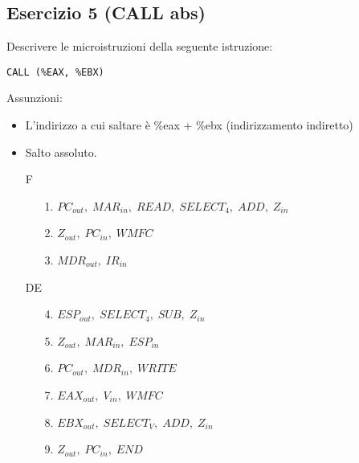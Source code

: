 \documentclass[a4paper]{article}
\theoremstyle{break}
\theoremstyle{break}
\theoremstyle{break}
\theoremstyle{break}
\begin{document}
\subsection{Esercizio 5 (CALL abs)}
\begin{exercise}
  Descrivere le microistruzioni della seguente istruzione:
  \begin{center}
    \texttt{CALL (\%EAX, \%EBX)}
  \end{center}

  Assunzioni:
  \begin{itemize}
    \item 
      L'indirizzo a cui saltare è \%eax + \%ebx (indirizzamento indiretto) 
    \item 
      Salto assoluto.
  \end{itemize}

  \begin{enumerate}
    \item [F]
      \begin{enumerate}
        \item [1.] \( PC_{out},\; MAR_{in},\; READ,\; SELECT_4,\; ADD,\; Z_{in} \) 
        \item [2.] \( Z_{out},\; PC_{in},\; WMFC \) 
        \item [3.] \( MDR_{out},\; IR_{in} \) 
      \end{enumerate}
    \item [DE]
      \begin{enumerate}
        \item [4.] \( ESP_{out},\; SELECT_4,\; SUB,\; Z_{in} \)  
        \item [5.] \( Z_{out},\; MAR_{in},\; ESP_{in} \) 
        \item [6.] \( PC_{out},\; MDR_{in},\; WRITE \) 
        \item [7.] \( EAX_{out},\; V_{in},\; WMFC \) 
        \item [8.] \( EBX_{out},\; SELECT_V,\; ADD,\; Z_{in} \) 
        \item [9.] \( Z_{out},\; PC_{in},\; END \) 
      \end{enumerate}
  \end{enumerate}
\end{exercise}
\end{document}
